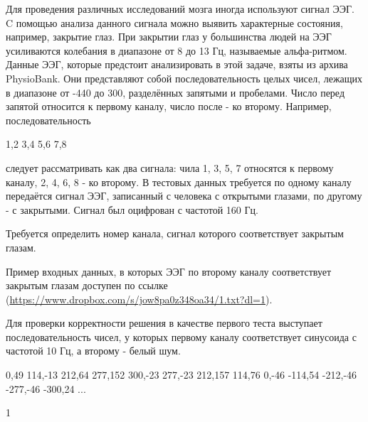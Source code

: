 
Для проведения различных исследований мозга иногда используют сигнал ЭЭГ. C помощью анализа данного сигнала можно выявить характерные состояния, например, закрытие глаз. При закрытии глаз у большинства людей на ЭЭГ усиливаются колебания в диапазоне от 8 до 13 Гц, называемые альфа-ритмом. Данные ЭЭГ, которые предстоит анализировать в этой задаче, взяты из архива PhysioBank. Они представляют собой последовательность целых чисел, лежащих в диапазоне от -440 до 300, разделённых запятыми и пробелами. Число перед запятой относится к первому каналу, число после - ко второму. Например, последовательность

1,2 3,4 5,6 7,8

следует рассматривать как два сигнала: чила 1, 3, 5, 7 относятся к первому каналу, 2, 4, 6, 8 - ко второму. В тестовых данных требуется по одному каналу передаётся сигнал ЭЭГ, записанный с человека с открытыми глазами, по другому - с закрытыми. Сигнал был оцифрован с частотой 160 Гц.

Требуется определить номер канала, сигнал которого соответствует закрытым глазам.

Пример входных данных, в которых ЭЭГ по второму каналу соответствует закрытым глазам доступен по ссылке (\url{https://www.dropbox.com/s/jow8pa0z348oa34/1.txt?dl=1}).

Для проверки корректности решения в качестве первого теста выступает последовательность чисел, у которых первому каналу соответствует синусоида с частотой 10 Гц, а второму - белый шум.



\begin{myverbbox}[\small]{\vinput}
    0,49 114,-13 212,64 277,152 300,-23 277,-23 212,157 
    114,76 0,-46 -114,54 -212,-46 -277,-46 -300,24
    ...
\end{myverbbox}
\begin{myverbbox}[\small]{\voutput}
   1
\end{myverbbox}

